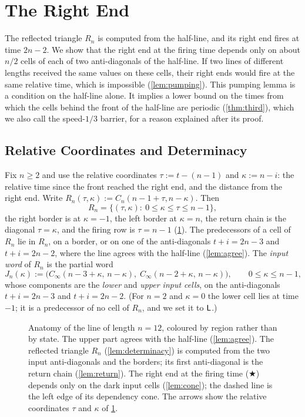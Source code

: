 \section{The Right End}\label{sec:right}

The reflected triangle $R_n$ is computed from the half-line, and its right end
fires at time $2n-2$. We show that the right end at the firing time depends
only on about $n/2$ cells of each of two anti-diagonals of the half-line. If
two lines of different lengths received the same values on these cells, their
right ends would fire at the same relative time, which is impossible (\cref{lem:pumping}). This
pumping lemma is a condition on the half-line alone. It implies a lower bound
on the times from which the cells behind the front of the half-line are
periodic (\cref{thm:third}), which we also call the speed-$1/3$ barrier, for a
reason explained after its proof.

\subsection{Relative Coordinates and Determinacy}

Fix $n\ge2$ and use the relative coordinates $\tau:=t-(n-1)$ and $\kappa:=n-i$:
the relative time since the front reached the right end, and the distance from
the right end. Write $R_n(\tau,\kappa):=C_n(n-1+\tau,n-\kappa)$. Then
\[
R_n=\{(\tau,\kappa):\ 0\le\kappa\le\tau\le n-1\},
\]
the right border is at $\kappa=-1$, the left border at $\kappa=n$, the return
chain is the diagonal $\tau=\kappa$, and the firing row is $\tau=n-1$
(\cref{fig:anatomy}). The predecessors of a cell of $R_n$ lie in $R_n$, on a
border, or on one of the anti-diagonals $t+i=2n-3$ and $t+i=2n-2$, where the
line agrees with the half-line (\cref{lem:agree}). The \emph{input word} of
$R_n$ is the partial word
\[
J_n(\kappa):=\bigl(C_\infty(n-3+\kappa,\,n-\kappa),\;C_\infty(n-2+\kappa,\,n-\kappa)\bigr),
\qquad 0\le\kappa\le n-1,
\]
whose components are the \emph{lower} and \emph{upper input cells}, on the
anti-diagonals $t+i=2n-3$ and $t+i=2n-2$. (For $n=2$ and $\kappa=0$ the lower
cell lies at time $-1$; it is a predecessor of no cell of $R_n$, and we set it
to $\mathsf L$.)

\begin{figure}[t]
\centering

\caption{Anatomy of the line of length $n=12$, coloured by region rather than
by state. The upper part agrees with the half-line (\cref{lem:agree}). The
reflected triangle $R_n$ (\cref{lem:determinacy}) is computed from the two
input anti-diagonals and the borders; its first anti-diagonal is the return
chain (\cref{lem:return}). The right end at the firing time ($\bigstar$)
depends only on the dark input cells (\cref{lem:cone}); the dashed line is the
left edge of its dependency cone. The arrows show the relative coordinates
$\tau$ and $\kappa$ of \cref{sec:right}.}
\label{fig:anatomy}
\end{figure}

